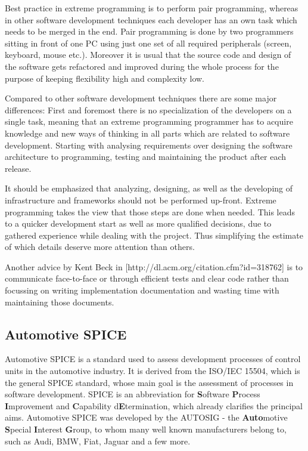 Best practice in extreme programming is to perform pair programming, whereas in other software development techniques each developer has an 
own task which needs to be merged in the end. Pair programming is done by two programmers sitting in front of one PC using just one set of 
all required peripherals (screen, keyboard, mouse etc.). Moreover it is usual that the source code and design of the software gets refactored 
and improved during the whole process for the purpose of keeping flexibility high and complexity low.

Compared to other software development techniques there are some major differences: First and foremost there is no specialization of the 
developers on a single task, meaning that an extreme programming programmer has to acquire knowledge and new ways of thinking in all parts 
which are related to software development. Starting with analysing requirements over designing the software architecture to programming, 
testing and maintaining the product after each release.

It should be emphasized that analyzing, designing, as well as the developing of infrastructure and frameworks should not be performed 
up-front. Extreme programming takes the view that those steps are done when needed. This leads to a quicker development start as well 
as more qualified decisions, due to gathered experience while dealing with the project. Thus simplifying the estimate of which details 
deserve more attention than others.

Another advice by Kent Beck in [http://dl.acm.org/citation.cfm?id=318762] is to communicate face-to-face or through efficient tests and 
clear code rather than focussing on writing implementation documentation and wasting time with maintaining those documents.

\subsection{Automotive SPICE}

Automotive SPICE is a standard used to assess development processes of control units in the automotive industry. It is derived from the 
ISO/IEC 15504, which is the general SPICE standard, whose main goal is the assessment of processes in software development. SPICE is an 
abbreviation for \textbf{S}oftware \textbf{P}rocess \textbf{I}mprovement and \textbf{C}apability d\textbf{E}termination, which already 
clarifies the principal aims. Automotive SPICE was developed by  the AUTOSIG - the \textbf{Auto}motive \textbf{S}pecial \textbf{I}nterest 
\textbf{G}roup, to whom many well known manufacturers belong to, such as Audi, BMW, Fiat, Jaguar and a few more.

